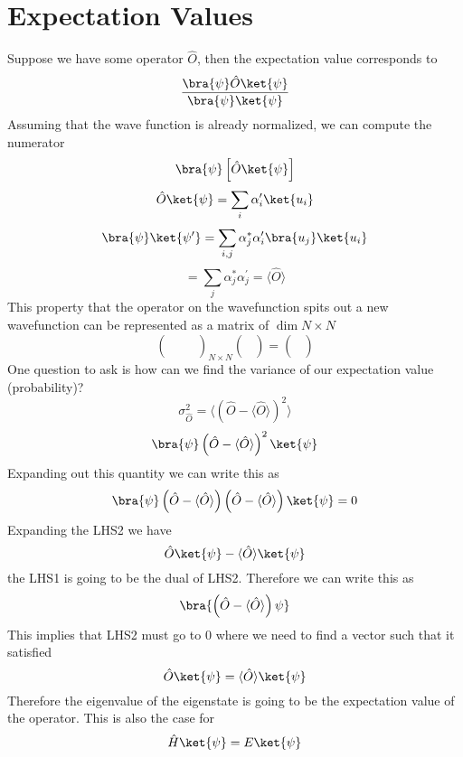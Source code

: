 \section{Expectation Values}
Suppose we have some operator \(\hat{O} \), then the expectation value corresponds to 
\[
    \frac{\bra{\psi } \hat{O}  \ket{\psi}}{\bra{\psi}\ket{\psi}}
\]   
Assuming that the wave function is already normalized, we can compute the numerator 
\[
    \bra{\psi} \left[ \hat{O} \ket{\psi} \right] 
\]
\[
    \hat{O} \ket{\psi} = \sum_{i} \alpha_i ^{\prime}  \ket{u_i} 
\]
\[
    \bra{\psi}\ket{\psi ^{\prime} } = \sum_{i,j} \alpha_j^* \alpha_i ^{\prime} \bra{u_j}\ket{u_i} 
\]
\[
    = \sum_{j} \alpha_j^* \alpha_j ^{\prime} = \langle \hat{O}  \rangle  
\]
This property that the operator on the wavefunction spits out a new wavefunction can be represented as a matrix of \(\dim N \times N\)
\[
    \begin{pmatrix}
         &  &   \\
         &  &   \\
         &  &   \\
    \end{pmatrix}_{N \times N} \begin{pmatrix}
          \\
          \\
          \\
    \end{pmatrix} = \begin{pmatrix}
          \\
          \\
          \\
    \end{pmatrix}
\] 
One question to ask is how can we find the variance of our expectation value (probability)?
\[
    \sigma_{\hat{O} }^{2}  = \langle \left( \hat{O} - \langle \hat{O}  \rangle  \right) ^{2}  \rangle 
\]
\[
    \bra{\psi} \left( \hat{O} - \langle \hat{O}  \rangle  \right) ^{2}  \ket{\psi}
\]
Expanding out this quantity we can write this as 
\[
    \bra{\psi} \left( \hat{O}  - \langle \hat{O}  \rangle  \right) 
    \left( \hat{O}  - \langle \hat{O}  \rangle  \right) \ket{\psi}  = 0
\]
Expanding the LHS2 we have 
\[
    \hat{O}  \ket{\psi} - \langle \hat{O}  \rangle \ket{\psi}
\]
the LHS1 is going to be the dual of LHS2. Therefore we can write this as 
\[
    \bra{ \left( \hat{O} - \langle \hat{O}  \rangle  \right) \psi  }
\]
This implies that LHS2 must go to \(0\) where we need to find a vector such that it satisfied 
\[
     \hat{O}  \ket{\psi} = \langle \hat{O}  \rangle  \ket{\psi}
\] 
Therefore the eigenvalue of the eigenstate is going to be the expectation value of the operator. This is also the case for 
\[
    \hat{H}  \ket{\psi} = E \ket{\psi}
\]


